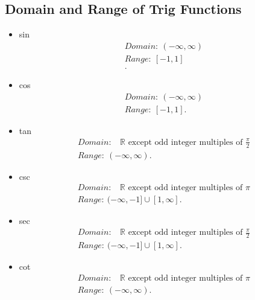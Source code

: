 \documentclass{report}
\begin{document}
        \subsection{Domain and Range of Trig Functions}
        \begin{itemize}
            \item sin
              \begin{align*}
                Domain:\ (-\infty, \infty) \\
                Range:\ [-1,1] \\
              .\end{align*}
            \item cos
              \begin{align*}
                Domain:\ (-\infty, \infty) \\
                Range:\ [-1,1]
              .\end{align*}
            \item tan
              \begin{align*}
                Domain:\ \text{ $\mathbb{R}$ except odd integer multiples of $\frac{\pi}{2}$} \\
                Range:\ (-\infty, \infty)
              .\end{align*}
            \item csc
              \begin{align*}
                Domain:\ \text{ $\mathbb{R}$ except odd integer multiples of $\pi $} \\
                Range:\ (-\infty, -1] \cup [1, \infty]
              .\end{align*}
            \item sec
              \begin{align*}
                Domain:\ \text{ $\mathbb{R}$ except odd integer multiples of $\frac{\pi}{2}$} \\
                Range:\ (-\infty, -1] \cup [1, \infty]
              .\end{align*}
            \item cot
              \begin{align*}
                Domain:\ \text{ $\mathbb{R}$ except odd integer multiples of $\pi $} \\
                Range:\ (-\infty, \infty)
              .\end{align*}
        \end{itemize}

      \bigbreak \noindent \bigbreak \noindent 
\end{document}
